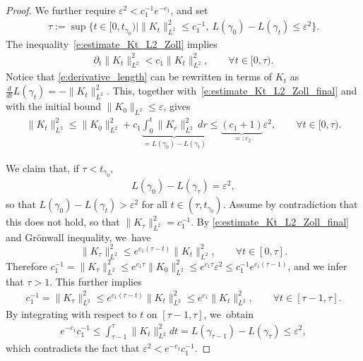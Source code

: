 \documentclass[JEP,XML,SOM,Unicode,NoFloatCountersInSection,published]{cedram}
\let\sep\mid
\let\epsilon\varepsilon
\theoremstyle{plain}
\theoremstyle{definition}
\begin{document}
\begin{proof}
We further require $\epsilon^2< c_1^{-1}e^{-c_1}$, and set
\begin{align*}
\tau:=\sup\big\{ t\in[0,t_{\gamma_0})\sep \|K_t\|_{L^2}^2\leq c_1^{-1},\ L(\gamma_0)-L(\gamma_t)\leq\epsilon^2 \big\}.
\end{align*}
The inequality~\eqref{e:estimate_Kt_L2_Zoll} implies
\begin{align}\label{e:estimate_Kt_L2_Zoll_final}
\partial_t \|K_t\|_{L^2}^2
<
c_1 \|K_t\|_{L^2}^2,
\qquad \forall t\in[0,\tau).
\end{align}
Notice that \eqref{e:derivative_length} can be rewritten in terms of $K_t$ as
$\tfrac{d}{dt} L(\gamma_t) = -\|K_t\|_{L^2}^2$. This, togeth\-er with~\eqref{e:estimate_Kt_L2_Zoll_final} and with the initial bound $\|K_{0}\|_{L^2}\leq\epsilon$, gives
\begin{align*}
\|K_{t}\|_{L^2}^2
\leq
\|K_{0}\|_{L^2}^2
+c_1\underbrace{\int_0^t \|K_{r}\|_{L^2}^2\,dr}_{=L(\gamma_0)-L(\gamma_t)}
\leq
\underbrace{(c_1+1)}_{=:c_2}\epsilon^2,\qquad
\forall t\in[0,\tau).
\end{align*}

We claim that, if $\tau<t_{\gamma_0}$,
\begin{align*}
L(\gamma_0)-L(\gamma_\tau)=\epsilon^2,
\end{align*}
so that $L(\gamma_0)-L(\gamma_t)>\epsilon^2$ for all $t\in(\tau,t_{\gamma_0})$.
Assume by contradiction that this does not hold, so that $\|K_\tau\|_{L^2}^2= c_1^{-1}$.
By \eqref{e:estimate_Kt_L2_Zoll_final} and Grönwall inequality, we~have
\[
\|K_{\tau}\|_{L^2}^2 \leq e^{c_1(\tau-t)} \|K_{t}\|_{L^2}^2,\qquad\forall t\in[0,\tau].
\]
Therefore
$c_1^{-1}=\|K_{\tau}\|_{L^2}^2\leq e^{c_1\tau}\|K_0\|_{L^2}^2\leq e^{c_1\tau}\epsilon^2\leq c_1^{-1}e^{c_1(\tau-1)}$,
and we infer that $\tau>1$.
This further implies
\begin{align*}
c_1^{-1} = \|K_{\tau}\|_{L^2}^2 \leq e^{c_1(\tau-t)} \|K_{t}\|_{L^2}^2 \leq e^{c_1} \|K_{t}\|_{L^2}^2,\qquad\forall t\in[\tau-1,\tau].
\end{align*}
By integrating with respect to $t$ on $[\tau-1,\tau]$, we~obtain
\begin{align*}
e^{-c_1}c_1^{-1}
\leq
\int_{\tau-1}^{\tau} \|K_{t}\|_{L^2}^2dt
=
L(\gamma_{\tau-1})- L(\gamma_{\tau})
\leq
\epsilon^2,
\end{align*}
which contradicts the fact that $\epsilon^2<e^{-c_1}c_1^{-1}$.


\end{proof}
\end{document}
